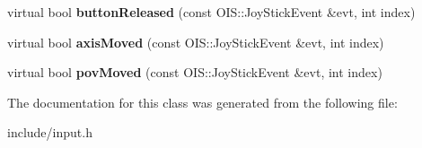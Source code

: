 \begin{DoxyCompactItemize}
\item 
\hypertarget{classInputHandler_a678d1c1c3f13bd89c272a0b9470233e8}{
virtual bool {\bfseries button\-Released} (const \-O\-I\-S\-::\-Joy\-Stick\-Event \&evt, int index)}
\label{db/df6/classInputHandler_a678d1c1c3f13bd89c272a0b9470233e8}

\item 
\hypertarget{classInputHandler_a41f8fea16edd3ca9791c623d0e330d8a}{
virtual bool {\bfseries axis\-Moved} (const \-O\-I\-S\-::\-Joy\-Stick\-Event \&evt, int index)}
\label{db/df6/classInputHandler_a41f8fea16edd3ca9791c623d0e330d8a}

\item 
\hypertarget{classInputHandler_a228aafa9352ef4add64b63d947ecf88a}{
virtual bool {\bfseries pov\-Moved} (const \-O\-I\-S\-::\-Joy\-Stick\-Event \&evt, int index)}
\label{db/df6/classInputHandler_a228aafa9352ef4add64b63d947ecf88a}

\end{DoxyCompactItemize}


\-The documentation for this class was generated from the following file\-:\begin{DoxyCompactItemize}
\item 
include/input.\-h\end{DoxyCompactItemize}

